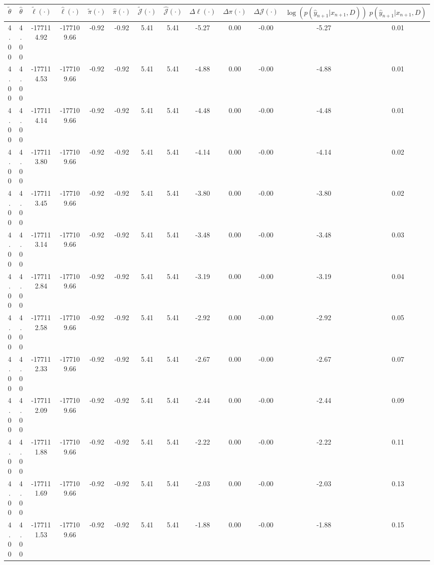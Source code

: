 \begin{table}[htbp]
        \centering
        \tiny
        \begin{adjustbox}{angle=90}
            \begin{tabular}{|c|c|c|c|c|c|c|c|c|c|c|c|c|}
                \hline
                 $\tilde{\theta}$ & $\hat{\theta}$ & $\tilde{\ell}(\cdot)$ & $\hat{\ell}(\cdot)$ & $\tilde{\pi}(\cdot)$ & $\hat{\pi}(\cdot)$ & $\tilde{\mathcal{J}}(\cdot)$ & $\hat{\mathcal{J}}(\cdot)$ & $\Delta \ell(\cdot)$ & $\Delta \pi(\cdot)$ & $\Delta \mathcal{J}(\cdot)$ & $\log(p(\hat{y}_{n+1}|x_{n+1}, D))$ & $p(\hat{y}_{n+1}|x_{n+1}, D)$ \\
                \hline
                 4.00 & 4.00 & -177114.92 & -177109.66 & -0.92 & -0.92 & 5.41 & 5.41 & -5.27 & 0.00 & -0.00 & -5.27 & 0.01\\ \hline
 4.00 & 4.00 & -177114.53 & -177109.66 & -0.92 & -0.92 & 5.41 & 5.41 & -4.88 & 0.00 & -0.00 & -4.88 & 0.01\\ \hline
 4.00 & 4.00 & -177114.14 & -177109.66 & -0.92 & -0.92 & 5.41 & 5.41 & -4.48 & 0.00 & -0.00 & -4.48 & 0.01\\ \hline
 4.00 & 4.00 & -177113.80 & -177109.66 & -0.92 & -0.92 & 5.41 & 5.41 & -4.14 & 0.00 & -0.00 & -4.14 & 0.02\\ \hline
 4.00 & 4.00 & -177113.45 & -177109.66 & -0.92 & -0.92 & 5.41 & 5.41 & -3.80 & 0.00 & -0.00 & -3.80 & 0.02\\ \hline
 4.00 & 4.00 & -177113.14 & -177109.66 & -0.92 & -0.92 & 5.41 & 5.41 & -3.48 & 0.00 & -0.00 & -3.48 & 0.03\\ \hline
 4.00 & 4.00 & -177112.84 & -177109.66 & -0.92 & -0.92 & 5.41 & 5.41 & -3.19 & 0.00 & -0.00 & -3.19 & 0.04\\ \hline
 4.00 & 4.00 & -177112.58 & -177109.66 & -0.92 & -0.92 & 5.41 & 5.41 & -2.92 & 0.00 & -0.00 & -2.92 & 0.05\\ \hline
 4.00 & 4.00 & -177112.33 & -177109.66 & -0.92 & -0.92 & 5.41 & 5.41 & -2.67 & 0.00 & -0.00 & -2.67 & 0.07\\ \hline
 4.00 & 4.00 & -177112.09 & -177109.66 & -0.92 & -0.92 & 5.41 & 5.41 & -2.44 & 0.00 & -0.00 & -2.44 & 0.09\\ \hline
 4.00 & 4.00 & -177111.88 & -177109.66 & -0.92 & -0.92 & 5.41 & 5.41 & -2.22 & 0.00 & -0.00 & -2.22 & 0.11\\ \hline
 4.00 & 4.00 & -177111.69 & -177109.66 & -0.92 & -0.92 & 5.41 & 5.41 & -2.03 & 0.00 & -0.00 & -2.03 & 0.13\\ \hline
 4.00 & 4.00 & -177111.53 & -177109.66 & -0.92 & -0.92 & 5.41 & 5.41 & -1.88 & 0.00 & -0.00 & -1.88 & 0.15\\ \hline

\end{tabular}
\end{adjustbox}
\end{table}
